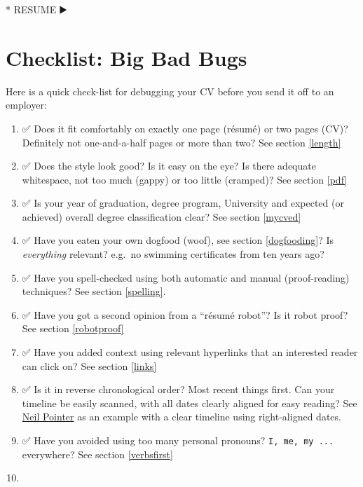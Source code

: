 \documentclass[
]{book}
\newenvironment{Shaded}{\begin{snugshade}}{\end{snugshade}}
\newcommand{\NormalTok}[1]{#1}
\newcommand{\SpecialStringTok}[1]{\textcolor[rgb]{0.31,0.60,0.02}{#1}}
\providecommand{\tightlist}{%
  \setlength{\itemsep}{0pt}\setlength{\parskip}{0pt}}
\begin{document}
\begin{Shaded}
\begin{Highlighting}[]
\SpecialStringTok{* }\NormalTok{RESUME ▶️}
\end{Highlighting}
\end{Shaded}

\hypertarget{checklist}{%
\section{Checklist: Big Bad Bugs}\label{checklist}}

Here is a quick check-list for debugging your CV before you send it off to an employer:

\begin{enumerate}
\def\labelenumi{\arabic{enumi}.}
\tightlist
\item
  ✅ Does it fit comfortably on exactly one page (résumé) or two pages (CV)? Definitely not one-and-a-half pages or more than two? See section \ref{length}
\item
  ✅ Does the style look good? Is it easy on the eye? Is there adequate whitespace, not too much (gappy) or too little (cramped)? See section \ref{pdf}
\item
  ✅ Is your year of graduation, degree program, University and expected (or achieved) overall degree classification clear? See section \ref{mycved}
\item
  ✅ Have you eaten your own dogfood (woof), see section \ref{dogfooding}? Is \emph{everything} relevant? e.g.~no swimming certificates from ten years ago?
\item
  ✅ Have you spell-checked using both automatic and manual (proof-reading) techniques? See section \ref{spelling}.
\item
  ✅ Have you got a second opinion from a ``résumé robot''? Is it robot proof? See section \ref{robotproof} 🤖
\item
  ✅ Have you added context using relevant hyperlinks that an interested reader can click on? See section \ref{links}
\item
  ✅ Is it in reverse chronological order? Most recent things first. Can your timeline be easily scanned, with all dates clearly aligned for easy reading? See \href{https://www.cdyf.me/Neil_Pointer.pdf}{Neil Pointer} as an example with a clear timeline using right-aligned dates.
\item
  ✅ Have you avoided using too many personal pronouns? \texttt{I,\ me,\ my\ ...} everywhere? See section \ref{verbsfirst}
\item

\end{enumerate}
\end{document}
